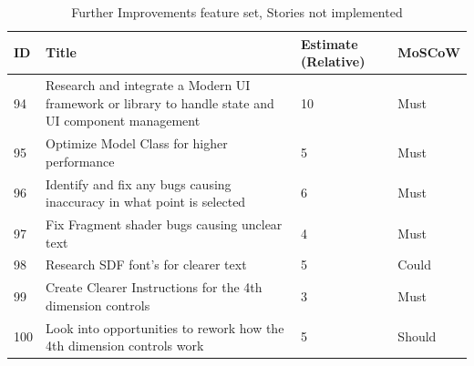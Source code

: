 \begin{table}[hbt!]
    \begin{tabularx}{\textwidth}{ | X | X | X | X | }
        \hline
        ID  & Title                                                                                               & Estimate (Relative) & MoSCoW \\
        \hline
        94  & Research and integrate a Modern UI framework or library to handle state and UI component management & 10                  & Must   \\
        \hline
        95  & Optimize Model Class for higher performance                                                         & 5                   & Must   \\
        \hline
        96  & Identify and fix any bugs causing inaccuracy in what point is selected                              & 6                   & Must   \\
        \hline
        97  & Fix Fragment shader bugs causing unclear text                                                       & 4                   & Must   \\
        \hline
        98  & Research SDF font's for clearer text                                                                & 5                   & Could  \\
        \hline
        99  & Create Clearer Instructions for the 4th dimension controls                                          & 3                   & Must   \\
        \hline
        100 & Look into opportunities to rework how the 4th dimension controls work                               & 5                   & Should \\
        \hline
    \end{tabularx}
    \caption{Further Improvements feature set, Stories not implemented}
    \label{FI2}
\end{table}
